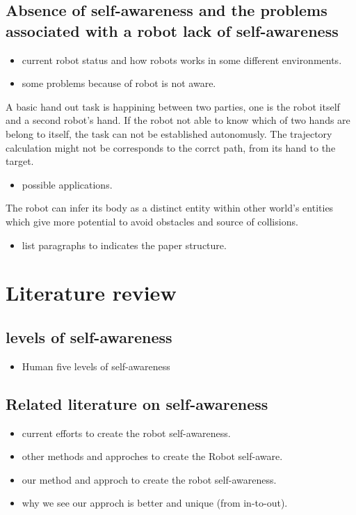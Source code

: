 \documentclass[12pt]{article}
\begin{document}
\subsection{Absence of self-awareness and the problems associated with a robot lack of self-awareness}
\begin{itemize}
\item current robot status and how robots works in some different environments.
\end{itemize}
\begin{itemize}
\item some problems because of robot is not aware.
\end{itemize}
A basic hand out task is happining between two parties, one is the robot itself and a second robot's hand. If the robot not able to know which of two hands are belong to itself, the task can not be established autonomusly. The trajectory calculation might not be corresponds to the corrct path, from its hand to the target.

\begin{itemize}
\item possible applications.
\end{itemize}
The robot can infer its body as a distinct entity within other world's entities which give more potential to avoid obstacles and source of collisions.

\begin{itemize}
\item list paragraphs to indicates the paper structure.
\end{itemize}

\section{Literature review}
\subsection{levels of self-awareness}
\begin{itemize}
\item Human five levels of self-awareness
\end{itemize}
\subsection{Related literature on self-awareness}
\begin{itemize}
\item current efforts to create the robot self-awareness.
\item other methods and approches to create the Robot self-aware.
\item our method and approch to create the robot self-awareness.
\item why we see our approch is better and unique (from in-to-out).
\end{itemize}
\end{document}
